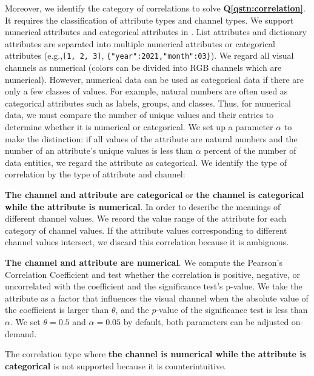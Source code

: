 Moreover, we identify the category of correlations to solve \textbf{Q\ref{qstn:correlation}}.
It requires the classification of attribute types and channel types.
We support numerical attributes and categorical attributes in \ApproachName.
List attributes and dictionary attributes are separated into multiple numerical attributes or categorical attributes (e.g.,\texttt{[1, 2, 3]}, \texttt{\{"year":2021,"month":03\}}).
We regard all visual channels as numerical (colors can be divided into RGB channels which are numerical).
However, numerical data can be used as categorical data if there are only a few classes of values.
For example, natural numbers are often used as categorical attributes such as labels, groups, and classes.
Thus, for numerical data, we must compare the number of unique values and their entries to determine whether it is numerical or categorical.
We set up a parameter $\alpha$ to make the distinction: if all values of the attribute are natural numbers and
the number of an attribute's unique values is less than $\alpha$ percent of the number of data entities, we regard the attribute as categorical.
We identify the type of correlation by the type of attribute and channel:
\begin{compactitem}
    \item \textbf{The channel and attribute are categorical} or \textbf{the channel is categorical while the attribute is numerical}. 
    In order to describe the meanings of different channel values,
    We record the value range of the attribute for each category of channel values.
    If the attribute values corresponding to different channel values intersect, we discard this correlation because it is ambiguous.
    
    \item \textbf{The channel and attribute are numerical}. We compute the Pearson's Correlation Coefficient and test whether the correlation is positive, negative, or uncorrelated with the coefficient and the significance test's p-value. We take the attribute as a factor that influences the visual channel when the absolute value of the coefficient is larger than $\theta$, and the $p$-value of the significance test is less than $\alpha$. We set $\theta = 0.5$ and $\alpha = 0.05$ by default, both parameters can be adjusted on-demand.
\end{compactitem}
The correlation type where \textbf{the channel is numerical while the attribute is categorical} is not supported because it is counterintuitive.


